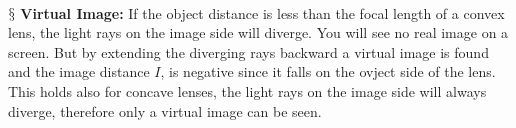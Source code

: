 \documentclass[9pt,a4paper, twocolumn]{article}
\newcommand{\newpoint}[1]{\ \\ \indent$\mathsection$ \textbf{#1}}
\begin{document}
          \newpoint{Virtual Image:} If the object distance is less than the focal length of a convex lens, the light rays on the image side will diverge. You will see no real image on a screen. But by extending the diverging rays backward a virtual image is found and the image distance $I$, is negative since it falls on the ovject side of the lens. This holds also for concave lenses, the light rays on the image side will always diverge, therefore only a virtual image can be seen.
          
\end{document}
